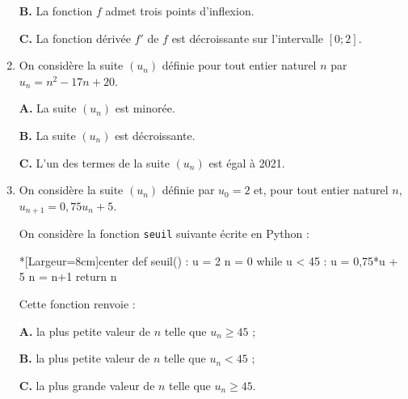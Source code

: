 \begin{enumerate}
	\textbf{B.} La fonction $f$ admet trois points d'inflexion.
	
	\textbf{C.} La fonction dérivée $f'$ de $f$ est décroissante sur l'intervalle $[0;2]$.
	\item  On considère la suite $\left(u_n\right)$ définie pour tout entier naturel $n$ par $u_n = n^2 - 17n + 20$. 
	
	\textbf{A.} La suite $\left(u_n\right)$ est minorée.
	
	\textbf{B.} La suite $\left(u_n\right)$ est décroissante.
	
	\textbf{C.} L'un des termes de la suite $\left(u_n\right)$ est égal à \num{2021}.
	\item On considère la suite $\left(u_n\right)$ définie par $u_0 = 2$ et, pour tout entier naturel $n$, $u_{n+1} = 0,75u_n +5$.
	
	On considère la fonction \og \texttt{seuil} \fg{} suivante écrite en \textsf{Python} :
	
\begin{CodePythonLstAlt}*[Largeur=8cm]{center}
def seuil() :
	u = 2
	n = 0
	while u < 45 :
		u = 0,75*u + 5
		n = n+1
	return n
\end{CodePythonLstAlt}
	
	Cette fonction renvoie :
	
	\textbf{A.} la plus petite valeur de $n$ telle que $u_n \geqslant  45$ ;
	
	\textbf{B.} la plus petite valeur de $n$ telle que $u_n  < 45$ ;
	
	\textbf{C.} la plus grande valeur de $n$ telle que $u_n \geqslant 45$.
\end{enumerate}

